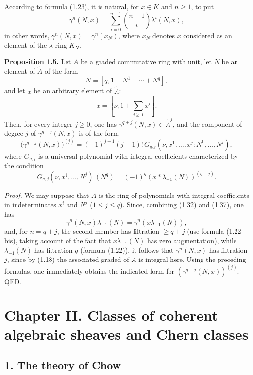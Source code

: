 \documentclass[11pt]{article}
\begin{document}
According to formula (1.23), it is natural, for $x\in K$ and $n\geq 1$, to put
\begin{equation}\tag{1.37}
\gamma^n(N,x)=\sum_{i=0}^{n-1}\binom{n-1}{i}\lambda^i(N,x),
\end{equation}
in other words, $\gamma^n(N,x)=\gamma^n(x_N)$, where $x_N$ denotes $x$ considered as an element of the $\lambda$-ring $K_N$.

\textbf{Proposition 1.5.} Let $A$ be a graded commutative ring with unit, let $N$ be an element of $\widetilde A$ of the form
\[
N=[q,1+N^1+\cdots+N^q],
\]
and let $x$ be an arbitrary element of $\widetilde A$:
\[
x=[\nu,1+\sum_{i\geq 1}x^i].
\]
Then, for every integer $j\geq 0$, one has $\gamma^{q+j}(N,x)\in\widetilde A^j$, and the component of degree $j$ of $\gamma^{q+j}(N,x)$ is of the form
\begin{equation}\tag{1.38}
\bigl(\gamma^{q+j}(N,x)\bigr)^{(j)}=(-1)^{j-1}(j-1)!\,G_{q,j}(\nu,x^1,\ldots,x^j;N^1,\ldots,N^j),
\end{equation}
where $G_{q,j}$ is a universal polynomial with integral coefficients characterized by the condition
\begin{equation}\tag{1.39}
G_{q,j}(\nu,x^1,\ldots,N^j)\,(N^q)=(-1)^q(x*\lambda_{-1}(N))^{(q+j)}.
\end{equation}

\emph{Proof.} We may suppose that $A$ is the ring of polynomials with integral coefficients in indeterminates $x^i$ and $N^j$ ($1\leq j\leq q$). Since, combining (1.32) and (1.37), one has
\begin{equation}\tag{1.40}
\gamma^n(N,x)\lambda_{-1}(N)=\gamma^n(x\lambda_{-1}(N)),
\end{equation}
and, for $n=q+j$, the second member has filtration $\geq q+j$ (use formula (1.22 bis), taking account of the fact that $x\lambda_{-1}(N)$ has zero augmentation), while $\lambda_{-1}(N)$ has filtration $q$ (formula (1.22)), it follows that $\gamma^n(N,x)$ has filtration $j$, since by (1.18) the associated graded of $A$ is integral here. Using the preceding formulas, one immediately obtains the indicated form for $(\gamma^{q+j}(N,x))^{(j)}$. QED.

\section*{Chapter II. Classes of coherent algebraic sheaves and Chern classes}

\subsection*{1. The theory of Chow}
\end{document}

